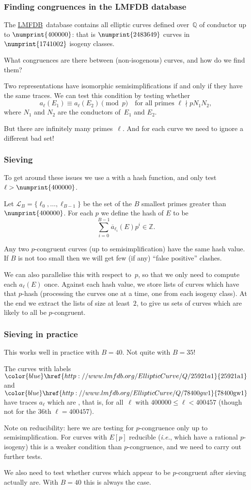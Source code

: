 \documentclass[compress]{beamer}
\newcommand{\Q}{\mathbb Q}
\newcommand{\Z}{\mathbb Z}
\newcommand{\LL}{\mathcal L}
\newcommand{\lmfdbec}[3]{\color{blue}\href{http://www.lmfdb.org/EllipticCurve/Q/#1#2#3}{{\text{\rm#1#2#3}}}}
\newcommand{\LMFDB}{\href{http://www.lmfdb.org/EllipticCurve/Q}{\color{blue}LMFDB}}
\newcommand{\high}[1]{\emph{\color{blue}{#1}}}
\begin{document}
\begin{frame}\frametitle{Finding congruences in the LMFDB database}
The \LMFDB\ database contains all elliptic curves defined over~$\Q$ of
conductor up to $\numprint{400000}$: that is $\numprint{2483649}$
curves in $\numprint{1741002}$ isogeny classes.

What congruences are there between (non-isogenous) curves, and how do
we find them?

Two representations have isomorphic semisimplifications if and only if
they have the same traces. We can test this condition by testing
whether
\[ a_{\ell}(E_1)\equiv a_{\ell}(E_2)\pmod{p}
\quad \text{for all primes } \ell \nmid pN_1N_2,
\] 
where $N_1$ and $N_2$ are the conductors of~$E_1$ and $E_2$.

But there are infinitely many primes~$\ell$.  And for each curve we need to
ignore a different bad set!
\end{frame}

\begin{frame}\frametitle{Sieving}
  To get around these issues we use a \high{sieve} with a hash
  function, and only test $\ell>\numprint{400000}$.

  Let $\LL_B=\{\ell_0,\dots,\ell_{B-1}\}$ be the set of the $B$
  smallest primes greater than $\numprint{400000}$.  For each $p$ we
  define the hash of $E$ to be
  \[\sum_{i=0}^{B-1}\overline{a}_{\ell_i}(E)p^i\in\Z.\]

 Any two $p$-congruent curves (up to semisimplification) have the same
 hash value.  If $B$ is not too small then we will get few (if any)
 ``false positive'' clashes.

  We can also parallelise this with respect to~$p$, so that we only
  need to compute each $a_{\ell}(E)$ once.  Against each hash value,
  we store lists of curves which have that $p$-hash (processing the
  curves one at a time, one from each isogeny class).  At the end we
  extract the lists of size at least~$2$, to give us sets of curves
  which are likely to all be $p$-congruent. %

\end{frame}

\begin{frame}\frametitle{Sieving in practice}
  This works well in practice with $B=40$. Not quite with $B=35$!

  \pause
  \medskip
  The curves with labels $\lmfdbec{25921}{a}{1}$ and
  $\lmfdbec{78400}{gw}{1}$ have traces $a_{\ell}$ which are \high{equal
    for all~$\ell\in\LL_{35}$}, that is, for all~$\ell$ with
  $400000\le \ell<400457$ (though not for the 36th $\ell=400457$).
  \pause
  \medskip

  Note on reducibility: here we are testing for $p$-congruence only up
  to semisimplification.  For curves with $E[p]$ reducible
  (\textit{i.e.}, which have a rational $p$-isogeny) this is a weaker
  condition than $p$-congruence, and we need to carry out further
  tests.

    \pause
  \medskip
  We also need to test whether curves which appear to be $p$-congruent
  after sieving actually are.  With $B=40$ this is always the case.
\end{frame}
\end{document}
